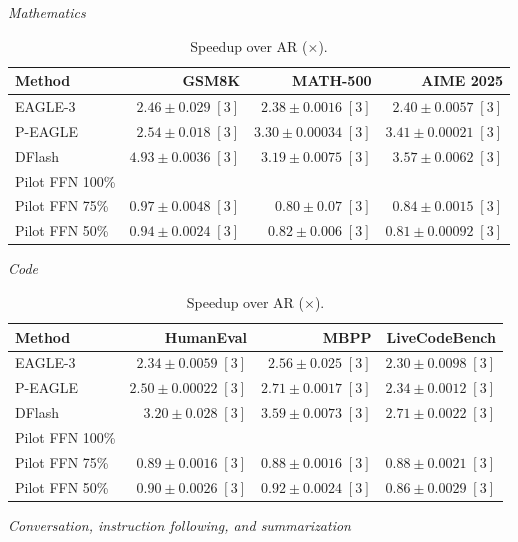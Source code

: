 \begin{table}[!tp]
\centering
\small
\setlength{\tabcolsep}{3pt}
\caption{Speedup over AR (\(\times\)).}
\label{tab:speedup}
\textit{Mathematics}\par\smallskip
\begin{tabular}{@{}>{\raggedright\arraybackslash}p{3.7cm}rrr@{}}
\toprule
Method & GSM8K & MATH-500 & AIME 2025 \\
\midrule
EAGLE-3 & \(2.46 \pm 0.029\;[3]\) & \(2.38 \pm 0.0016\;[3]\) & \(2.40 \pm 0.0057\;[3]\) \\
P-EAGLE & \(2.54 \pm 0.018\;[3]\) & \(\mathbf{3.30} \pm 0.00034\;[3]\) & \(3.41 \pm 0.00021\;[3]\) \\
DFlash & \(\mathbf{4.93} \pm 0.0036\;[3]\) & \(3.19 \pm 0.0075\;[3]\) & \(\mathbf{3.57} \pm 0.0062\;[3]\) \\
Pilot FFN 100\% &  &  &  \\
Pilot FFN 75\% & \(0.97 \pm 0.0048\;[3]\) & \(0.80 \pm 0.07\;[3]\) & \(0.84 \pm 0.0015\;[3]\) \\
Pilot FFN 50\% & \(0.94 \pm 0.0024\;[3]\) & \(0.82 \pm 0.006\;[3]\) & \(0.81 \pm 0.00092\;[3]\) \\
\bottomrule
\end{tabular}
\par\medskip
\textit{Code}\par\smallskip
\begin{tabular}{@{}>{\raggedright\arraybackslash}p{3.7cm}rrr@{}}
\toprule
Method & HumanEval & MBPP & LiveCodeBench \\
\midrule
EAGLE-3 & \(2.34 \pm 0.0059\;[3]\) & \(2.56 \pm 0.025\;[3]\) & \(2.30 \pm 0.0098\;[3]\) \\
P-EAGLE & \(2.50 \pm 0.00022\;[3]\) & \(2.71 \pm 0.0017\;[3]\) & \(2.34 \pm 0.0012\;[3]\) \\
DFlash & \(\mathbf{3.20} \pm 0.028\;[3]\) & \(\mathbf{3.59} \pm 0.0073\;[3]\) & \(\mathbf{2.71} \pm 0.0022\;[3]\) \\
Pilot FFN 100\% &  &  &  \\
Pilot FFN 75\% & \(0.89 \pm 0.0016\;[3]\) & \(0.88 \pm 0.0016\;[3]\) & \(0.88 \pm 0.0021\;[3]\) \\
Pilot FFN 50\% & \(0.90 \pm 0.0026\;[3]\) & \(0.92 \pm 0.0024\;[3]\) & \(0.86 \pm 0.0029\;[3]\) \\
\bottomrule
\end{tabular}
\par\medskip
\textit{Conversation, instruction following, and summarization}\par\smallskip

\end{table}
